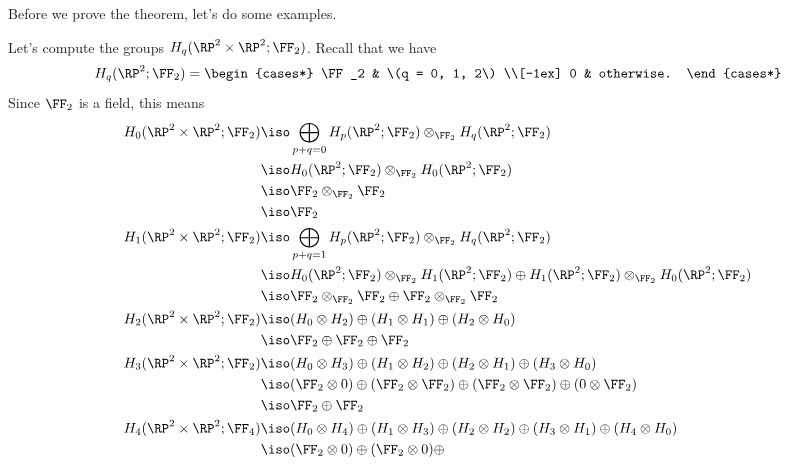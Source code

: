 \documentclass{standalone}
\begin{document}
Before we prove the theorem, let's do some examples.
\begin{example}
  Let's compute the groups \(H_q(\RP^2 \times \RP^2; \FF_2)\).
  Recall that we have
  \[
    H_q(\RP^2; \FF_2) = \begin{cases*}
      \FF_2 & \(q = 0, 1, 2\) \\[-1ex]
      0 & otherwise.
    \end{cases*}
  \]
  Since \(\FF_2\) is a field, this means
  \begin{align*}
    H_0(\RP^2 \times \RP^2; \FF_2)
      &\iso \bigoplus_{p + q = 0} H_p(\RP^2; \FF_2) \otimes_{\FF_2}
                                  H_q(\RP^2; \FF_2) \\
      &\iso H_0(\RP^2; \FF_2) \otimes_{\FF_2} H_0(\RP^2; \FF_2) \\
      &\iso \FF_2 \otimes_{\FF_2} \FF_2 \\
      &\iso \FF_2 \\
    H_1(\RP^2 \times \RP^2; \FF_2)
      &\iso \bigoplus_{p + q = 1} H_p(\RP^2; \FF_2) \otimes_{\FF_2}
                                  H_q(\RP^2; \FF_2) \\
      &\iso H_0(\RP^2; \FF_2) \otimes_{\FF_2} H_1(\RP^2; \FF_2) \oplus
            H_1(\RP^2; \FF_2) \otimes_{\FF_2} H_0(\RP^2; \FF_2) \\
      &\iso \FF_2 \otimes_{\FF_2} \FF_2 \oplus \FF_2 \otimes_{\FF_2} \FF_2 \\
    H_2(\RP^2 \times \RP^2; \FF_2)
      &\iso (H_0 \otimes H_2) \oplus
            (H_1 \otimes H_1) \oplus
            (H_2 \otimes H_0) \\
      &\iso \FF_2 \oplus \FF_2 \oplus \FF_2 \\
    H_3(\RP^2 \times \RP^2; \FF_2)
      &\iso (H_0 \otimes H_3) \oplus
            (H_1 \otimes H_2) \oplus
            (H_2 \otimes H_1) \oplus
            (H_3 \otimes H_0) \\
      &\iso (\FF_2 \otimes 0    ) \oplus
            (\FF_2 \otimes \FF_2) \oplus
            (\FF_2 \otimes \FF_2) \oplus
            (0     \otimes \FF_2) \\
      &\iso \FF_2 \oplus \FF_2 \\
    H_4(\RP^2 \times \RP^2; \FF_4)
      &\iso (H_0 \otimes H_4) \oplus
            (H_1 \otimes H_3) \oplus
            (H_2 \otimes H_2) \oplus
            (H_3 \otimes H_1) \oplus
            (H_4 \otimes H_0) \\
      &\iso (\FF_2 \otimes 0    ) \oplus
            (\FF_2 \otimes 0    ) \oplus

\end{align*}
\end{example}
\end{document}
